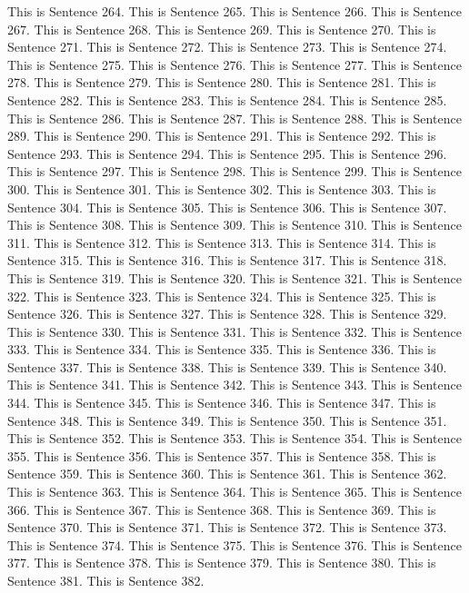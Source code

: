 \documentclass{article}
\begin{document}
This is Sentence 264.
This is Sentence 265.
This is Sentence 266.
This is Sentence 267.
This is Sentence 268.
This is Sentence 269.
This is Sentence 270.
This is Sentence 271.
This is Sentence 272.
This is Sentence 273.
This is Sentence 274.
This is Sentence 275.
This is Sentence 276.
This is Sentence 277.
This is Sentence 278.
This is Sentence 279.
This is Sentence 280.
This is Sentence 281.
This is Sentence 282.
This is Sentence 283.
This is Sentence 284.
This is Sentence 285.
This is Sentence 286.
This is Sentence 287.
This is Sentence 288.
This is Sentence 289.
This is Sentence 290.
This is Sentence 291.
This is Sentence 292.
This is Sentence 293.
This is Sentence 294.
This is Sentence 295.
This is Sentence 296.
This is Sentence 297.
This is Sentence 298.
This is Sentence 299.
This is Sentence 300.
This is Sentence 301.
This is Sentence 302.
This is Sentence 303.
This is Sentence 304.
This is Sentence 305.
This is Sentence 306.
This is Sentence 307.
This is Sentence 308.
This is Sentence 309.
This is Sentence 310.
This is Sentence 311.
This is Sentence 312.
This is Sentence 313.
This is Sentence 314.
This is Sentence 315.
This is Sentence 316.
This is Sentence 317.
This is Sentence 318.
This is Sentence 319.
This is Sentence 320.
This is Sentence 321.
This is Sentence 322.
This is Sentence 323.
This is Sentence 324.
This is Sentence 325.
This is Sentence 326.
This is Sentence 327.
This is Sentence 328.
This is Sentence 329.
This is Sentence 330.
This is Sentence 331.
This is Sentence 332.
This is Sentence 333.
This is Sentence 334.
This is Sentence 335.
This is Sentence 336.
This is Sentence 337.
This is Sentence 338.
This is Sentence 339.
This is Sentence 340.
This is Sentence 341.
This is Sentence 342.
This is Sentence 343.
This is Sentence 344.
This is Sentence 345.
This is Sentence 346.
This is Sentence 347.
This is Sentence 348.
This is Sentence 349.
This is Sentence 350.
This is Sentence 351.
This is Sentence 352.
This is Sentence 353.
This is Sentence 354.
This is Sentence 355.
This is Sentence 356.
This is Sentence 357.
This is Sentence 358.
This is Sentence 359.
This is Sentence 360.
This is Sentence 361.
This is Sentence 362.
This is Sentence 363.
This is Sentence 364.
This is Sentence 365.
This is Sentence 366.
This is Sentence 367.
This is Sentence 368.
This is Sentence 369.
This is Sentence 370.
This is Sentence 371.
This is Sentence 372.
This is Sentence 373.
This is Sentence 374.
This is Sentence 375.
This is Sentence 376.
This is Sentence 377.
This is Sentence 378.
This is Sentence 379.
This is Sentence 380.
This is Sentence 381.
This is Sentence 382.
\end{document}
